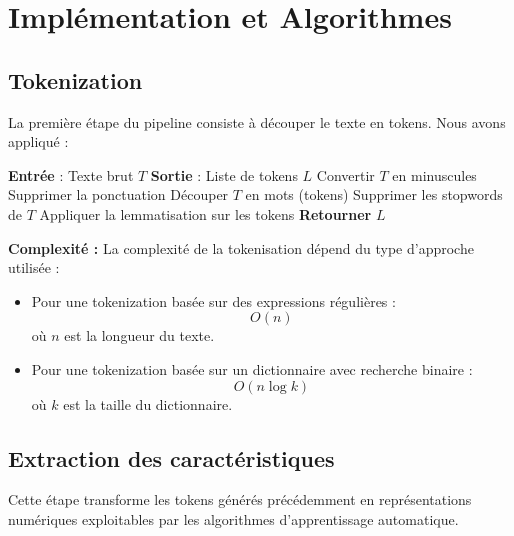 \newpage
\section{Implémentation et Algorithmes}

\subsection{Tokenization}

La première étape du pipeline consiste à découper le texte en tokens. Nous avons appliqué :

\begin{algorithm}[H]
\caption{Tokenization}
\begin{algorithmic}[1]
\State \textbf{Entrée} : Texte brut $T$
\State \textbf{Sortie} : Liste de tokens $L$
\State Convertir $T$ en minuscules
\State Supprimer la ponctuation
\State Découper $T$ en mots (tokens)
\State Supprimer les stopwords de $T$
\State Appliquer la lemmatisation sur les tokens
\State \textbf{Retourner} $L$
\end{algorithmic}
\end{algorithm}
\textbf{Complexité :}  
La complexité de la tokenisation dépend du type d’approche utilisée :
\begin{itemize}
    \item Pour une tokenization basée sur des expressions régulières : 
    \begin{equation}
    O(n)
    \end{equation}
    où \( n \) est la longueur du texte.
    \item Pour une tokenization basée sur un dictionnaire avec recherche binaire :
    \begin{equation}
    O(n \log k)
    \end{equation}
    où \( k \) est la taille du dictionnaire.
\end{itemize}

\subsection{Extraction des caractéristiques} Cette étape transforme les tokens générés précédemment en représentations numériques exploitables par les algorithmes d'apprentissage automatique.

